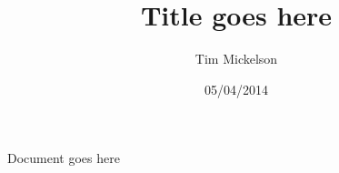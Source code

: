 \documentclass[a4paper]{article}
\title{Title goes here}
\author{Tim Mickelson}
\date{05/04/2014}
\begin{document}
\maketitle

\newpage
Document goes here
\end{document}
